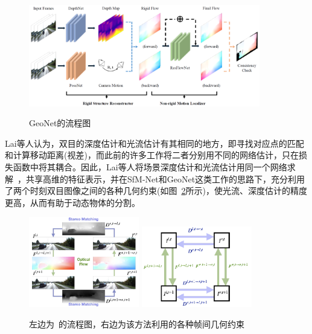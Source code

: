 \begin{figure}[htbp]
	\centering
	\includegraphics[width=0.9\textwidth]{figs/1-2/geonet.png} 
	\label{geonet}
	\caption{GeoNet的流程图}
\end{figure}

Lai等人认为，双目的深度估计和光流估计有其相同的地方，即寻找对应点的匹配和计算移动距离(视差)，而此前的许多工作将二者分别用不同的网络估计，只在损失函数中将其耦合。因此，Lai等人将场景深度估计和光流估计用同一个网络求解~\cite{bridging}，共享高维的特征表示，并在SfM-Net和GeoNet这类工作的思路下，充分利用了两个时刻双目图像之间的各种几何约束(如图~\ref{bridge}所示)，使光流、深度估计的精度更高，从而有助于动态物体的分割。

\begin{figure}[htbp]
	\centering
	\includegraphics[width=0.43\textwidth]{figs/1-2/bridge1.png}
	\hspace{30pt}
	\includegraphics[width=0.43\textwidth]{figs/1-2/bridge2.png}
	\label{bridge}
	\caption{左边为~\cite{bridging}的流程图，右边为该方法利用的各种帧间几何约束}
\end{figure}

